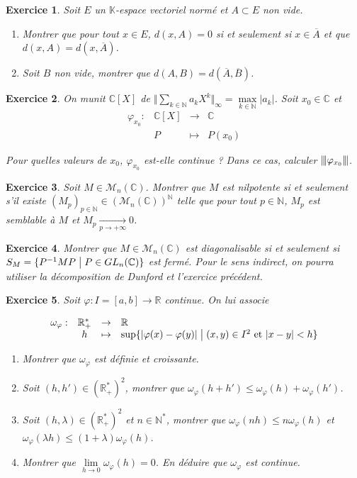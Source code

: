\documentclass[12pt]{article}
\newtheorem{exercise}{Exercice}[section]
\theoremstyle{remark}
\theoremstyle{remark}
\newcommand{\K}{\mathbb{K}} \newcommand{\R}{\mathbb{R}}
\newcommand{\C}{\mathbb{C}} \newcommand{\Q}{\mathbb{Q}}
\newcommand{\N}{\mathbb{N}} \newcommand{\Z}{\mathbb{Z}}
\newcommand{\M}{\mathcal{M}} \renewcommand{\L}{\mathcal{L}}
\newcommand{\vertiii}[1]{{\left\vert\kern-0.25ex\left\vert\kern-0.25ex\left\vert{}#1
\right\vert\kern-0.25ex\right\vert\kern-0.25ex\right\vert}}
\newcommand{\function}[5]{
	$$
	\begin{array}{rccl}
		#1: & #2 & \to & #3 \\
		& #4 & \mapsto & #5
	\end{array}
	$$
}
\begin{document}
\begin{exercise}
	Soit $E$ un $\K$-espace vectoriel normé et $A\subset E$ non vide.
	\begin{enumerate}
		\item Montrer que pour tout $x\in E$, $d(x,A)=0$ si et seulement si $x\in\overline{A}$ et que $d(x,A)=d(x,\overline{A})$.
		\item Soit $B$ non vide, montrer que $d(A,B)=d(\overline{A},\overline{B})$.
	\end{enumerate}
\end{exercise}

\begin{exercise}
	On munit $\C[X]$ de $\Vert\sum_{k\in\N}a_{k}X^{k}\Vert_{\infty}=\max\limits_{k\in\N}\vert a_{k}\vert$. Soit $x_{0}\in\C$ et \function{\varphi_{x_0}}{\C[X]}{\C}{P}{P(x_{0})}
	Pour quelles valeurs de $x_{0}$, $\varphi_{x_{0}}$ est-elle continue ? Dans ce cas, calculer $\vertiii{\varphi_{x_{0}}}$.
\end{exercise}

\begin{exercise}
	Soit $M\in\M_{n}(\C)$. Montrer que $M$ est nilpotente si et seulement s'il existe $(M_{p})_{p\in\N}\in(\M_{n}(\C))^{\N}$ telle que pour tout $p\in\N$, $M_{p}$ est semblable à $M$ et $M_{p}\xrightarrow[p\to+\infty]{}0$.
\end{exercise}

\begin{exercise}
	Montrer que $M\in\M_{n}(\C)$ est diagonalisable si et seulement si $S_{M}=\{P^{-1}MP\bigm| P\in GL_{n}(\C)\}$ est fermé. Pour le sens indirect, on pourra utiliser la décomposition de Dunford et l'exercice précédent.
\end{exercise}

\begin{exercise}
	Soit $\varphi:I=[a,b]\to\R$ continue. On lui associe 
	\function{\omega_{\varphi}}{\R_+^*}{\R}{h}{\sup\{\vert\varphi(x)-\varphi(y)\vert\bigm| (x,y)\in I^2\text{ et }\vert x-y\vert <h\}}
	\begin{enumerate}
		\item Montrer que $\omega_{\varphi}$ est définie et croissante.
		\item Soit $(h,h')\in(\R_{+}^{*})^{2}$, montrer que $\omega_{\varphi}(h+h')\leqslant\omega_{\varphi}(h)+\omega_{\varphi}(h')$.
		\item Soit $(h,\lambda)\in(\R_{+}^{*})^{2}$ et $n\in\N^{*}$, montrer que $\omega_{\varphi}(nh)\leqslant n\omega_{\varphi}(h)$ et $\omega_{\varphi}(\lambda h)\leqslant (1+\lambda)\omega_{\varphi}(h)$.
		\item Montrer que $\lim\limits_{h\to 0}\omega_{\varphi}(h)=0$. En déduire que $\omega_{\varphi}$ est continue.
	\end{enumerate}
\end{exercise}
\end{document}
